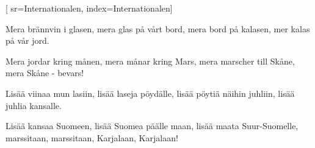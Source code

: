 [ 						
	sr={Internationalen},					
	index={Internationalen}]		
	
\beginverse*						
Mera brännvin i glasen,
mera glas på vårt bord,
mera bord på kalasen,
mer kalas på vår jord.
\endverse						

\beginverse				
Mera jordar kring månen,
mera månar kring Mars,
mera marscher till Skåne,
mera Skåne - bevars!
\endverse			

\beginverse*						
Lisää viinaa mun lasiin,
lisää laseja pöydälle,
lisää pöytiä näihin juhliin,
lisää juhlia kansalle.
\endverse					

\beginverse				
Lisää kansaa Suomeen,
lisää Suomea päälle maan,
lisää maata Suur-Suomelle,
marssitaan, marssitaan, Karjalaan, Karjalaan! 
\endverse					

\vspace{1cm}	
\endsong		
